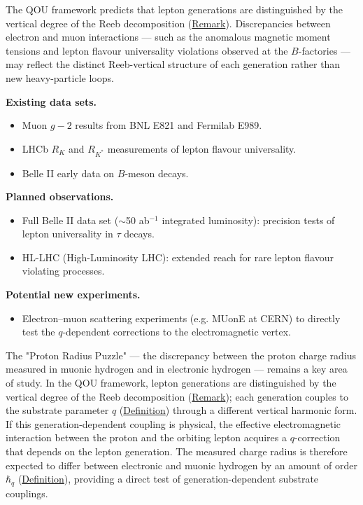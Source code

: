 \begin{remark}
  \label{rem:lepton-discrepancies}
The QOU framework predicts that lepton generations are distinguished by the
vertical degree of the Reeb decomposition
(\hyperref[rem:descartes-leptons]{Remark}). Discrepancies between electron and muon
interactions --- such as the anomalous magnetic moment tensions and lepton
flavour universality violations observed at the $B$-factories --- may reflect
the distinct Reeb-vertical structure of each generation rather than new
heavy-particle loops.
\end{remark}

\textbf{Existing data sets.}

\begin{itemize}
  \item Muon $g-2$ results from BNL E821 and Fermilab E989.
  \item LHCb $R_K$ and $R_{K^*}$ measurements of lepton flavour universality.
  \item Belle II early data on $B$-meson decays.
\end{itemize}

\textbf{Planned observations.}

\begin{itemize}
  \item Full Belle II data set ($\sim$50 ab$^{-1}$ integrated luminosity): precision tests of lepton universality in $\tau$ decays.
  \item HL-LHC (High-Luminosity LHC): extended reach for rare lepton flavour violating processes.
\end{itemize}

\textbf{Potential new experiments.}

\begin{itemize}
  \item Electron--muon scattering experiments (e.g. MUonE at CERN) to directly test the $q$-dependent corrections to the electromagnetic vertex.
\end{itemize}

\begin{remark}
  \label{rem:proton-radius-puzzle}
The "Proton Radius Puzzle" --- the discrepancy between the proton charge
radius measured in muonic hydrogen and in electronic hydrogen --- remains a
key area of study. In the QOU framework, lepton generations are distinguished
by the vertical degree of the Reeb decomposition
(\hyperref[rem:descartes-leptons]{Remark}); each generation couples to the substrate
parameter $q$ (\hyperref[def:substrate-parameter]{Definition}) through a different
vertical harmonic form. If this generation-dependent coupling is physical, the
effective electromagnetic interaction between the proton and the orbiting lepton
acquires a $q$-correction that depends on the lepton generation. The measured
charge radius is therefore expected to differ between electronic and muonic
hydrogen by an amount of order $\hbar_q$
(\hyperref[def:quantum-planck-constant]{Definition}), providing a direct test of
generation-dependent substrate couplings.
\end{remark}

